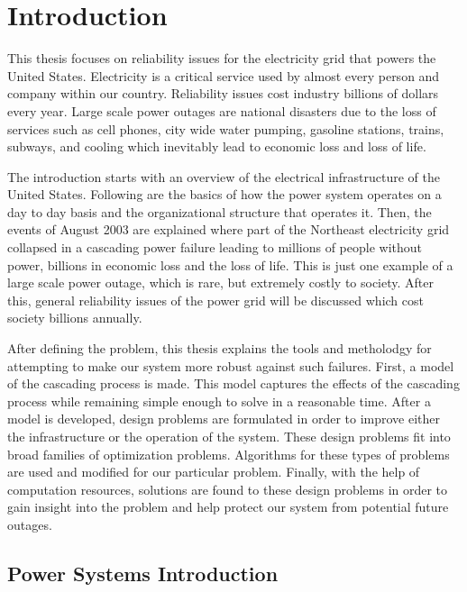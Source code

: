 \documentclass[class=report]{standalone}
\begin{document}
\chapter{Introduction}

	This thesis focuses on reliability issues for the electricity grid that powers the United States.  Electricity is a critical service used by almost every person and company within our country.  Reliability issues cost industry billions of dollars every year.  Large scale power outages are national disasters due to the loss of services such as cell phones, city wide water pumping, gasoline stations, trains, subways, and cooling which inevitably lead to economic loss and loss of life.  

	The introduction starts with an overview of the electrical infrastructure of the United States.  Following are the basics of how the power system operates on a day to day basis and the organizational structure that operates it. Then, the events of August 2003 are explained where part of the Northeast electricity grid collapsed in a cascading power failure leading to millions of people without power, billions in economic loss and the loss of life.  This is just one example of a large scale power outage, which is rare, but extremely costly to society. After this, general reliability issues of the power grid will be discussed which cost society billions annually.
 
After defining the problem, this thesis explains the tools and metholodgy for attempting to make our system more robust against such failures.  First, a model of the cascading process is made.  This model captures the effects of the cascading process while remaining simple enough to solve in a reasonable time.  After a model is developed, design problems are formulated in order to improve either the infrastructure or the operation of the system.  These design problems fit into broad families of optimization problems.  Algorithms for these types of problems are used and modified for our particular problem.  Finally, with the help of computation resources, solutions are found to these design problems in order to gain insight into the problem and help protect our system from potential future outages.

\section{Power Systems Introduction}


\end{document}
